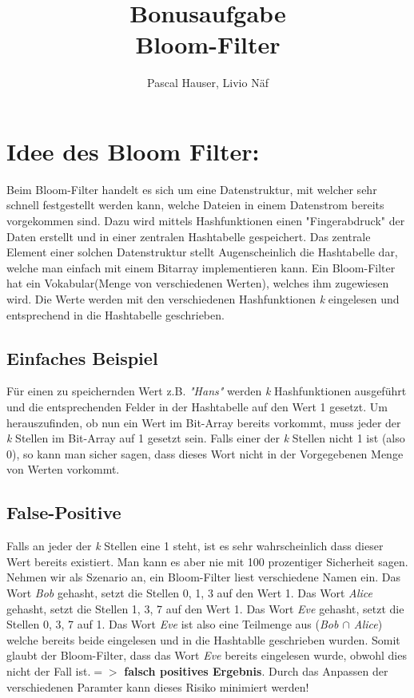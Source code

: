 \documentclass[16 pt]{article}
\author{Pascal Hauser, Livio Näf}
\title{%
\textbf{\Huge Bonusaufgabe} \\
  \Large Bloom-Filter \\
}
\begin{document}
\maketitle
\newpage
\section{Idee des Bloom Filter: }
Beim Bloom-Filter handelt es sich um eine Datenstruktur, mit welcher sehr schnell festgestellt werden kann, welche Dateien in einem Datenstrom bereits vorgekommen sind. Dazu wird mittels Hashfunktionen einen "Fingerabdruck" der Daten erstellt und in einer zentralen Hashtabelle gespeichert. 
Das zentrale Element einer solchen Datenstruktur stellt Augenscheinlich die Hashtabelle dar, welche man einfach mit einem Bitarray implementieren kann.
Ein Bloom-Filter hat ein Vokabular(Menge von verschiedenen Werten), welches ihm zugewiesen wird. Die Werte werden mit den verschiedenen Hashfunktionen \emph{k} eingelesen und entsprechend in die Hashtabelle geschrieben.
\subsection{Einfaches Beispiel}
Für einen zu speichernden Wert z.B. \emph{"Hans"} werden \emph{k} Hashfunktionen ausgeführt und die entsprechenden Felder in der Hashtabelle auf den Wert 1 gesetzt.
Um herauszufinden, ob nun ein Wert im Bit-Array bereits vorkommt, muss jeder der \emph{k} Stellen im Bit-Array auf 1 gesetzt sein. Falls einer der \emph{k} Stellen nicht 1 ist (also 0), so kann man sicher sagen, dass dieses Wort nicht in der Vorgegebenen Menge von Werten vorkommt.
\subsection{False-Positive}
Falls an jeder der \emph{k} Stellen eine 1 steht, ist es sehr wahrscheinlich dass dieser Wert bereits existiert. Man kann es aber nie mit 100 prozentiger Sicherheit sagen.
Nehmen wir als Szenario an, ein Bloom-Filter liest verschiedene Namen ein. Das Wort \emph{Bob} gehasht, setzt die Stellen 0, 1, 3 auf den Wert 1. Das Wort \emph{Alice} gehasht, setzt die Stellen 1, 3, 7 auf den Wert 1. Das Wort \emph{Eve} gehasht, setzt die Stellen 0, 3, 7 auf 1. Das Wort \emph{Eve} ist also eine Teilmenge aus (\emph{Bob $\cap$ Alice}) welche bereits beide eingelesen und in die Hashtablle geschrieben wurden. Somit glaubt der Bloom-Filter, dass das Wort \emph{Eve} bereits eingelesen wurde, obwohl dies nicht der Fall ist.$=>$  \textbf{falsch positives Ergebnis}.
Durch das Anpassen der verschiedenen Paramter kann dieses Risiko minimiert werden!
\end{document}
